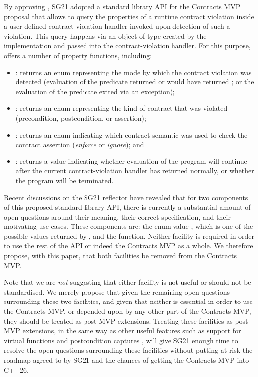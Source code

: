 By approving \cite{P2811R5}, SG21 adopted a standard library API for the Contracts MVP proposal \cite{P2900R4} that allows to query the properties of a runtime contract violation inside a user-defined contract-violation handler invoked upon detection of such a violation. This query happens via an object of type \mbox{} created by the implementation and passed into the contract-violation handler. For this purpose, \mbox{} offers a number of property functions, including: 
\begin{itemize}
\item {}: returns an enum representing the mode by which the contract violation was detected (evaluation of the predicate returned 
 or would have returned ; or the evaluation of the predicate exited via an exception);
\item {}: returns an enum representing the kind of contract that was violated (precondition, postcondition, or assertion); 
\item {}: returns an enum indicating which contract semantic was used to check the contract assertion (\emph{enforce} or \emph{ignore}); and
\item {}: returns a  value indicating whether evaluation of the program will continue after the current contract-violation handler has returned normally, or whether the program will be terminated.
\end{itemize}
Recent discussions on the SG21 reflector have revealed that for two components of this proposed standard library API, there is currently a substantial amount of open questions around their meaning, their correct specification, and their motivating use cases. These components are: the enum value \mbox{}, which is one of the possible values returned by \mbox{}, and the  function. Neither facility is required in order to use the rest of the \mbox{} API or indeed the Contracts MVP as a whole. We therefore propose, with this paper, that both facilities be removed from the Contracts MVP.

Note that we are \emph{not} suggesting that either facility is not useful or should not be standardised. We merely propose that given the remaining open questions surrounding these two facilities, and given that neither is essential in order to use the Contracts MVP, or depended upon by any other part of the Contracts MVP, they should be treated as post-MVP extensions. Treating these facilities as post-MVP extensions, in the same way as other useful features such as support for virtual functions \cite{D3097R0} and postcondition captures \cite{D3098R0}, will give SG21 enough time to resolve the open questions surrounding these facilities without putting at risk the roadmap agreed to by SG21 \cite{P2695R1} and the chances of getting the Contracts MVP into C++26.

